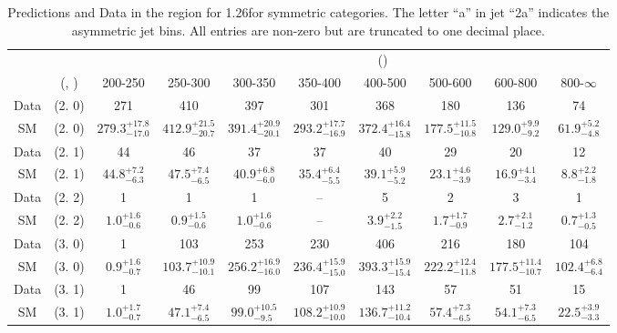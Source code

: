 \begin{table}[h!]
\tiny
\centering
\caption{Predictions and Data in the \mj region for 1.26\ifb for symmetric categories. The letter ``a'' in jet \eg ``2a''  indicates the asymmetric jet bins. All entries are non-zero but are truncated to one decimal place.\label{tab:predall_comb_mu_sym}}
\begin{tabular}
{cccccccccc}
	\hline\hline
&	&	& \multicolumn{8}{c}{\scalht (\gev)}\\ 
	&	 (\njet, \nb) & 200-250 & 250-300 & 300-350 & 350-400 & 400-500 & 500-600 & 600-800 & 800-$\infty$ \\ [0.8ex] 
\hline
	Data & (2. 0) & 271 & 410 & 397 & 301 & 368 & 180 & 136 & 74 \\[0.5ex] 
	SM & (2. 0) & $279.3^{+ 17.8 }_{- 17.0 }$ & $412.9^{+ 21.5 }_{- 20.7 }$ & $391.4^{+ 20.9 }_{- 20.1 }$ & $293.2^{+ 17.7 }_{- 16.9 }$ & $372.4^{+ 16.4 }_{- 15.8 }$ & $177.5^{+ 11.5 }_{- 10.8 }$ & $129.0^{+ 9.9 }_{- 9.2 }$ & $61.9^{+ 5.2 }_{- 4.8 }$ \\[0.5ex] 
	Data & (2. 1) & 44 & 46 & 37 & 37 & 40 & 29 & 20 & 12 \\[0.5ex] 
	SM & (2. 1) & $44.8^{+ 7.2 }_{- 6.3 }$ & $47.5^{+ 7.4 }_{- 6.5 }$ & $40.9^{+ 6.8 }_{- 6.0 }$ & $35.4^{+ 6.4 }_{- 5.5 }$ & $39.1^{+ 5.9 }_{- 5.2 }$ & $23.1^{+ 4.6 }_{- 3.9 }$ & $16.9^{+ 4.1 }_{- 3.4 }$ & $8.8^{+ 2.2 }_{- 1.8 }$ \\[0.5ex] 
	Data & (2. 2) & 1 & 1 & 1 & -- & 5 & 2 & 3 & 1 \\[0.5ex] 
	SM & (2. 2) & $1.0^{+ 1.6 }_{- 0.6 }$ & $0.9^{+ 1.5 }_{- 0.6 }$ & $1.0^{+ 1.6 }_{- 0.6 }$ & -- & $3.9^{+ 2.2 }_{- 1.5 }$ & $1.7^{+ 1.7 }_{- 0.9 }$ & $2.7^{+ 2.1 }_{- 1.2 }$ & $0.7^{+ 1.3 }_{- 0.5 }$ \\[0.5ex] 
	Data & (3. 0) & 1 & 103 & 253 & 230 & 406 & 216 & 180 & 104 \\[0.5ex] 
	SM & (3. 0) & $0.9^{+ 1.6 }_{- 0.7 }$ & $103.7^{+ 10.9 }_{- 10.1 }$ & $256.2^{+ 16.9 }_{- 16.0 }$ & $236.4^{+ 15.9 }_{- 15.0 }$ & $393.3^{+ 15.9 }_{- 15.4 }$ & $222.2^{+ 12.4 }_{- 11.8 }$ & $177.5^{+ 11.4 }_{- 10.7 }$ & $102.4^{+ 6.8 }_{- 6.4 }$ \\[0.5ex] 
	Data & (3. 1) & 1 & 46 & 99 & 107 & 143 & 57 & 51 & 15 \\[0.5ex] 
	SM & (3. 1) & $1.0^{+ 1.7 }_{- 0.7 }$ & $47.1^{+ 7.4 }_{- 6.5 }$ & $99.0^{+ 10.5 }_{- 9.5 }$ & $108.2^{+ 10.9 }_{- 10.0 }$ & $136.7^{+ 11.2 }_{- 10.4 }$ & $57.4^{+ 7.3 }_{- 6.5 }$ & $54.1^{+ 7.3 }_{- 6.5 }$ & $22.5^{+ 3.9 }_{- 3.3 }$ \\[0.5ex] 

\end{tabular}
\end{table}

